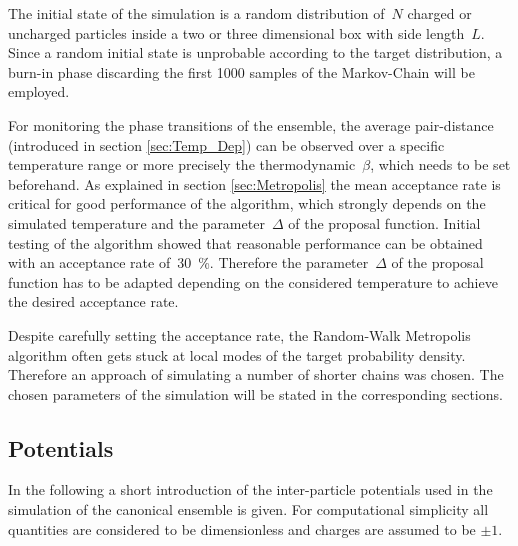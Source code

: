 \documentclass[11pt, a4paper]{article}
\numberwithin{equation}{section}
\begin{document}
The initial state of the simulation is a random distribution of~$N$ charged or uncharged particles inside a two or three dimensional box with side length~$L$.
Since a random initial state is unprobable according to the target distribution, a burn-in phase discarding the first 1000 samples of the Markov-Chain will be employed.

For monitoring the phase transitions of the ensemble, the average pair-distance (introduced in section \ref{sec:Temp_Dep}) can be observed over a specific temperature range or more precisely the thermodynamic~$\beta$, which needs to be set beforehand.
As explained in section \ref{sec:Metropolis} the mean acceptance rate is critical for good performance of the algorithm, which strongly depends on the simulated temperature and the parameter~$\Delta$ of the proposal function.
Initial testing of the algorithm showed that reasonable performance can be obtained with an acceptance rate of~\SI{30}{\percent}.
Therefore the parameter~$\Delta$ of the proposal function has to be adapted depending on the considered temperature to achieve the desired acceptance rate.

Despite carefully setting the acceptance rate, the Random-Walk Metropolis algorithm often gets stuck at local modes of the target probability density.
Therefore an approach of simulating a number of shorter chains was chosen.
The chosen parameters of the simulation will be stated in the corresponding sections.

\subsection{Potentials} \label{sec:Potentials}
In the following a short introduction of the inter-particle potentials used in the simulation of the canonical ensemble is given.
For computational simplicity all quantities are considered to be dimensionless and charges are assumed to be $\pm 1$.
\end{document}
